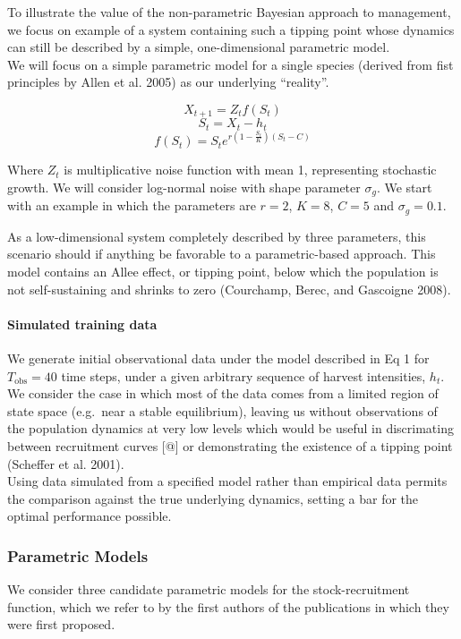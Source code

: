 \documentclass[author-year, review]{elsarticle} %
\begin{document}
To illustrate the value of the non-parametric Bayesian approach to
management, we focus on example of a system containing such a tipping
point whose dynamics can still be described by a simple, one-dimensional
parametric model.\\We will focus on a simple parametric model for a
single species (derived from fist principles by Allen et al. 2005) as
our underlying ``reality''.

\[X_{t+1} = Z_t f(S_t)  \] \[S_t = X_t - h_t \]
\[f(S_t) = S_t e^{r \left(1 - \frac{S_t}{K}\right)\left(S_t - C\right)} \]

Where $Z_t$ is multiplicative noise function with mean 1, representing
stochastic growth. We will consider log-normal noise with shape
parameter $\sigma_g$. We start with an example in which the parameters
are $r =2$, $K=8$, $C=5$ and $\sigma_g = 0.1$.

As a low-dimensional system completely described by three parameters,
this scenario should if anything be favorable to a parametric-based
approach. This model contains an Allee effect, or tipping point, below
which the population is not self-sustaining and shrinks to zero
(Courchamp, Berec, and Gascoigne 2008).

\paragraph{Simulated training data}

We generate initial observational data under the model described in Eq 1
for $T_{\textrm{obs}}=40$ time steps, under a given arbitrary sequence
of harvest intensities, $h_t$. We consider the case in which most of the
data comes from a limited region of state space (e.g.~near a stable
equilibrium), leaving us without observations of the population dynamics
at very low levels which would be useful in discrimating between
recruitment curves {[}@{]} or demonstrating the existence of a tipping
point (Scheffer et al. 2001).\\Using data simulated from a specified
model rather than empirical data permits the comparison against the true
underlying dynamics, setting a bar for the optimal performance possible.

\subsubsection{Parametric Models}

We consider three candidate parametric models for the stock-recruitment
function, which we refer to by the first authors of the publications in
which they were first proposed.
\end{document}
